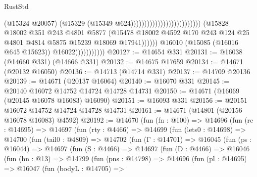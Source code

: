 \begin{lexlean}{RustStd}
\begin{coremodule}
                                                                                  (@15324 @20057)
                                                                                  (@15329
                                                                                    (@15349
                                                                                      @624))))))))))))))))))))))))))
                                  (@15828
                                    @18002
                                    @351
                                    @243
                                    @4801
                                    @5877
                                    (@15478
                                      @18002
                                      @4592
                                      @170
                                      @243
                                      @124
                                      @25
                                      @4801
                                      @4814
                                      @5875
                                      @15239
                                      @18069
                                      @17941))))))
                          @16010
                          (@15085 (@16016 @645 @15623))
                          @16022)))))))))))
@20127 := @14654 @331
@20131 := @16038 (@14660 @331) (@14666 @331)
@20132 := @14675 @17659
@20134 := @14671 (@20132 @16050)
@20136 := @14713 (@14714 @331)
@20137 := @14709 @20136
@20139 := @14671 (@20137 @16064)
@20140 := @16070 @331
@20145 := @20140 @16072 @14752 @14724 @14728 @14731
@20150 := @14671 (@16069 (@20145 @16078 @16083) @16090)
@20151 := @16093 @331
@20156 := @20151 @16072 @14752 @14724 @14728 @14731
@20161 := @14671 (@14801 (@20156 @16078 @16083) @4592)
@20192 := @14670
    (fun (fn : @100) =>
    @14696
      (fun (rc : @14695) =>
      @14697
        (fun (rty : @4466) =>
        @14699
          (fun (lets0 : @14698) =>
          @14700
            (fun (tail0 : @4809) =>
            @14702
              (fun (Γ : @14701) =>
              @16045
                (fun (ps : @16044) =>
                @14697
                  (fun (S : @4466) =>
                  @14697
                    (fun (D : @4466) =>
                    @16046
                      (fun (hn : @13) =>
                      @14799
                        (fun (pns : @14798) =>
                        @14696
                          (fun (pl : @14695) =>
                          @16047
                            (fun (bodyL : @14705) =>

\end{coremodule}
\end{lexlean}

